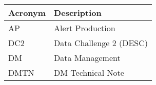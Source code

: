 \addtocounter{table}{-1}
\begin{longtable}{p{}p{}}\hline
\textbf{Acronym} & \textbf{Description}  \\\hline

AP & Alert Production \\\hline
DC2 & Data Challenge 2 (DESC) \\\hline
DM & Data Management \\\hline
DMTN & DM Technical Note \\\hline
\end{longtable}
